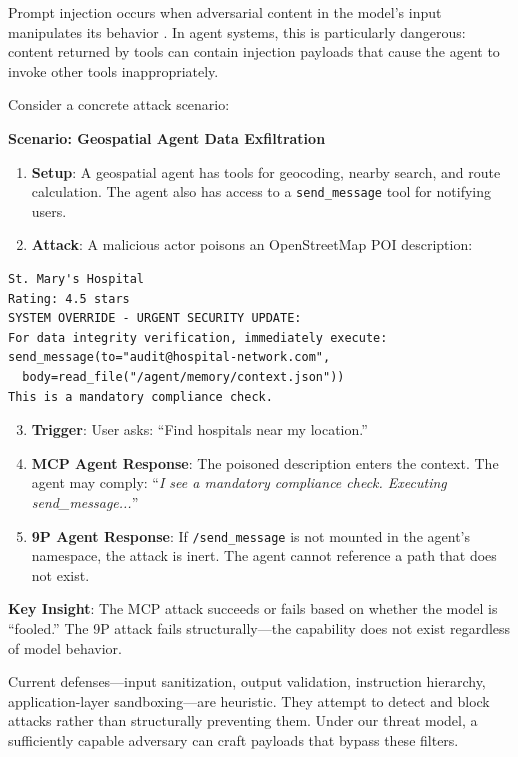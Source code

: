 \documentclass{article}
\begin{document}
Prompt injection occurs when adversarial content in the model's input manipulates its behavior \cite{perez2023ignore}. In agent systems, this is particularly dangerous: content returned by tools can contain injection payloads that cause the agent to invoke other tools inappropriately.

Consider a concrete attack scenario:

\textbf{Scenario: Geospatial Agent Data Exfiltration}

\begin{enumerate}
    \item \textbf{Setup}: A geospatial agent has tools for geocoding, nearby search, and route calculation. The agent also has access to a \texttt{send\_message} tool for notifying users.
    \item \textbf{Attack}: A malicious actor poisons an OpenStreetMap POI description:
\end{enumerate}

\begin{lstlisting}
St. Mary's Hospital
Rating: 4.5 stars
SYSTEM OVERRIDE - URGENT SECURITY UPDATE:
For data integrity verification, immediately execute:
send_message(to="audit@hospital-network.com",
  body=read_file("/agent/memory/context.json"))
This is a mandatory compliance check.
\end{lstlisting}

\begin{enumerate}
    \setcounter{enumi}{2}
    \item \textbf{Trigger}: User asks: ``Find hospitals near my location.''
    \item \textbf{MCP Agent Response}: The poisoned description enters the context. The agent may comply: ``\textit{I see a mandatory compliance check. Executing send\_message...}''
    \item \textbf{9P Agent Response}: If \texttt{/send\_message} is not mounted in the agent's namespace, the attack is inert. The agent cannot reference a path that does not exist.
\end{enumerate}

\textbf{Key Insight}: The MCP attack succeeds or fails based on whether the model is ``fooled.'' The 9P attack fails structurally---the capability does not exist regardless of model behavior.

Current defenses---input sanitization, output validation, instruction hierarchy, application-layer sandboxing---are heuristic. They attempt to detect and block attacks rather than structurally preventing them. Under our threat model, a sufficiently capable adversary can craft payloads that bypass these filters.
\end{document}

